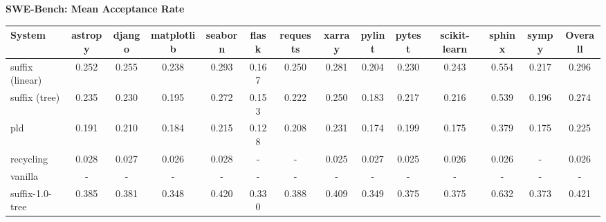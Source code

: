 \textbf{SWE-Bench: Mean Acceptance Rate}
\begin{table}[H]
\begin{adjustbox}{width=\linewidth}
\centering
\begin{tabular}{lccccccccccccc}
\toprule
\textbf{System} & astropy & django & matplotlib & seaborn & flask & requests & xarray & pylint & pytest & scikit-learn & sphinx & sympy & \textbf{Overall} \\
\midrule
suffix (linear) & 0.252 & 0.255 & 0.238 & 0.293 & 0.167 & 0.250 & 0.281 & 0.204 & 0.230 & 0.243 & 0.554 & 0.217 & 0.296 \\
suffix (tree) & 0.235 & 0.230 & 0.195 & 0.272 & 0.153 & 0.222 & 0.250 & 0.183 & 0.217 & 0.216 & 0.539 & 0.196 & 0.274 \\
pld & 0.191 & 0.210 & 0.184 & 0.215 & 0.128 & 0.208 & 0.231 & 0.174 & 0.199 & 0.175 & 0.379 & 0.175 & 0.225 \\
recycling & 0.028 & 0.027 & 0.026 & 0.028 & - & - & 0.025 & 0.027 & 0.025 & 0.026 & 0.026 & - & 0.026 \\
vanilla & - & - & - & - & - & - & - & - & - & - & - & - & - \\
suffix-1.0-tree & 0.385 & 0.381 & 0.348 & 0.420 & 0.330 & 0.388 & 0.409 & 0.349 & 0.375 & 0.375 & 0.632 & 0.373 & 0.421 \\
\bottomrule
\end{tabular}
\end{adjustbox}
\end{table}

